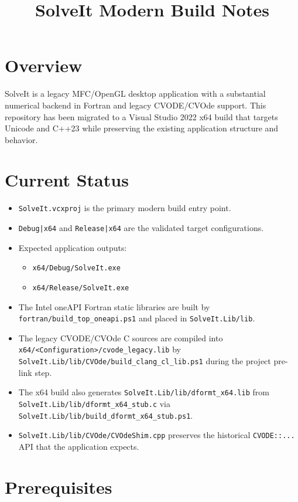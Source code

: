\documentclass[11pt]{article}
\title{SolveIt Modern Build Notes}
\author{}
\date{}
\begin{document}
\maketitle

\section*{Overview}

SolveIt is a legacy MFC/OpenGL desktop application with a substantial numerical backend in Fortran and legacy CVODE/CVOde support. This repository has been migrated to a Visual Studio 2022 x64 build that targets Unicode and C++23 while preserving the existing application structure and behavior.

\section*{Current Status}

\begin{itemize}[leftmargin=*]
\item \texttt{SolveIt.vcxproj} is the primary modern build entry point.
\item \texttt{Debug|x64} and \texttt{Release|x64} are the validated target configurations.
\item Expected application outputs:
\begin{itemize}[leftmargin=*]
\item \texttt{x64/Debug/SolveIt.exe}
\item \texttt{x64/Release/SolveIt.exe}
\end{itemize}
\item The Intel oneAPI Fortran static libraries are built by \texttt{fortran/build\_top\_oneapi.ps1} and placed in \texttt{SolveIt.Lib/lib}.
\item The legacy CVODE/CVOde C sources are compiled into \texttt{x64/<Configuration>/cvode\_legacy.lib} by \texttt{SolveIt.Lib/lib/CVOde/build\_clang\_cl\_lib.ps1} during the project pre-link step.
\item The x64 build also generates \texttt{SolveIt.Lib/lib/dformt\_x64.lib} from \texttt{SolveIt.Lib/lib/dformt\_x64\_stub.c} via \texttt{SolveIt.Lib/lib/build\_dformt\_x64\_stub.ps1}.
\item \texttt{SolveIt.Lib/lib/CVOde/CVOdeShim.cpp} preserves the historical \texttt{CVODE::...} API that the application expects.
\end{itemize}

\section*{Prerequisites}
\end{document}
